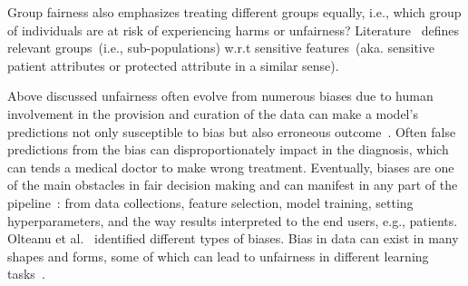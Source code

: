 \hspace*{3.5mm} Group fairness also emphasizes treating different groups equally, i.e., which group of individuals are at risk of experiencing harms or unfairness? Literature~\cite{verma2018fairness} defines relevant groups~(i.e., sub-populations) w.r.t sensitive features~(aka. sensitive patient attributes or protected attribute in a similar sense).
\fi 

\hspace*{3.5mm} Above discussed unfairness often evolve from numerous biases due to human involvement in the provision and curation of the data can make a model's predictions not only susceptible to bias but also erroneous outcome~\cite{futia2020integration}. Often false predictions from the bias can disproportionately impact in the diagnosis, which can tends a medical doctor to make wrong treatment. Eventually, biases are one of the main obstacles in fair decision making and can manifest in any part of the pipeline~\cite{GoogleBiasinMLPipeline,fairness_survey}: from data collections, feature selection, model training, setting hyperparameters, and the way results  interpreted to the end users, e.g., patients. Olteanu et al.~\cite{biasList} identified different types of biases. Bias in data can exist in many shapes and forms, some of which can lead to unfairness in different learning tasks~\cite{fairness_survey}. 

